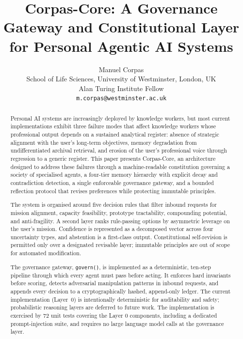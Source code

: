 \documentclass[11pt,a4paper]{article}
\title{Corpas-Core: A Governance Gateway and Constitutional Layer for Personal Agentic AI Systems}
\author{Manuel Corpas\\
  School of Life Sciences, University of Westminster, London, UK\\
  Alan Turing Institute Fellow\\
  \texttt{m.corpas@westminster.ac.uk}
}
\date{}
\begin{document}
\maketitle

\begin{abstract}

Personal AI systems are increasingly deployed by knowledge workers, but most current implementations exhibit three failure modes that affect knowledge workers whose professional output depends on a sustained analytical register: absence of strategic alignment with the user's long-term objectives, memory degradation from undifferentiated archival retrieval, and erosion of the user's professional voice through regression to a generic register. This paper presents Corpas-Core, an architecture designed to address these failures through a machine-readable constitution governing a society of specialised agents, a four-tier memory hierarchy with explicit decay and contradiction detection, a single enforceable governance gateway, and a bounded reflection protocol that revises preferences while protecting immutable principles.

The system is organised around five decision rules that filter inbound requests for mission alignment, capacity feasibility, prototype tractability, compounding potential, and anti-fragility. A second layer ranks rule-passing options by asymmetric leverage on the user's mission. Confidence is represented as a decomposed vector across four uncertainty types, and abstention is a first-class output. Constitutional self-revision is permitted only over a designated revisable layer; immutable principles are out of scope for automated modification.

The governance gateway, \texttt{govern()}, is implemented as a deterministic, ten-step pipeline through which every agent must pass before acting. It enforces hard invariants before scoring, detects adversarial manipulation patterns in inbound requests, and appends every decision to a cryptographically hashed, append-only ledger. The current implementation (Layer~0) is intentionally deterministic for auditability and safety; probabilistic reasoning layers are deferred to future work. The implementation is exercised by 72 unit tests covering the Layer 0 components, including a dedicated prompt-injection suite, and requires no large language model calls at the governance layer.


\end{abstract}
\end{document}
